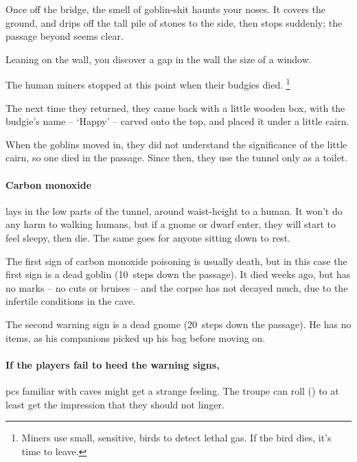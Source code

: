\begin{multicols}{2}
\begin{boxtext}
  Once off the bridge, the smell of goblin-shit haunts your noses.
  It covers the ground, and drips off the tall pile of stones to the side, then stops suddenly; the passage beyond seems clear.

  Leaning on the wall, you discover a gap in the wall the size of a window.
\end{boxtext}


\begin{exampletext}
  The human miners stopped at this point when their budgies died.%
  \footnote{Miners use small, sensitive, birds to detect lethal gas.  If the bird dies, it's time to leave.}

  The next time they returned, they came back with a little wooden box, with the budgie's name -- `Happy' -- carved onto the top, and placed it under a little cairn.

  When the goblins moved in, they did not understand the significance of the little cairn, so one died in the passage.
  Since then, they use the tunnel only as a toilet.
\end{exampletext}

\paragraph{Carbon monoxide}
lays in the low parts of the tunnel, around waist-height to a human.
It won't do any harm to walking humans, but if a gnome or dwarf enter, they will start to feel sleepy, then die.
The same goes for anyone sitting down to rest.

The first sign of carbon monoxide poisoning is usually death, but in this case the first sign is a dead goblin (10~\glspl{step} down the passage).
It died weeks ago, but has no marks -- no cuts or bruises -- and the corpse has not decayed much, due to the infertile conditions in the cave.

The second warning sign is a dead gnome (20~\glspl{step} down the passage).
He has no items, as his companions picked up his bag before moving on.

\paragraph{If the players fail to heed the warning signs,}
\glspl{pc} familiar with caves might get a strange feeling.
The troupe can roll  (\tn[13]) to at least get the impression that they should not linger.


\end{multicols}

